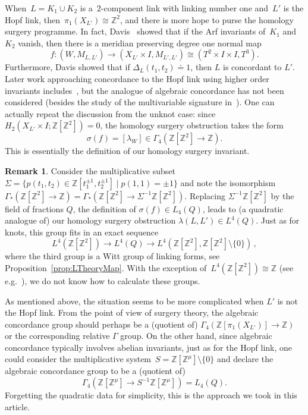 \documentclass[10.9pt,a4paper]{amsart}
\theoremstyle{definition}
\newtheorem{remark}[theorem]{Remark}
\theoremstyle{remark}
\newcommand{\Z}{\mathbb{Z}}
\begin{document}
When~$L=K_1 \cup K_2$ is a~$2$-component link with linking number one and~$L'$ is the Hopf link, then~$\pi_1(X_{L'}) \cong \Z^2$,  and there is more hope to purse the homology surgery programme.
In fact, Davis~\cite{DavisConcordant} showed that if the Arf invariants of~$K_1$ and~$K_2$ vanish, then there is a meridian preserving degree one normal map 
$$f \colon (W,M_{L,L'}) \to (X_{L'} \times I,M_{L',L'}) \cong (T^2\times I \times I,T^3).$$
Furthermore, Davis showed that if $\Delta_L(t_1,t_2) \doteq 1$, then $L$ is concordant to $L'$.
Later work approaching concordance to the Hopf link using higher order invariants includes~\cite{FriedlPowellHopf,ChaSymmetric,KimWhitney}, but the analogue of algebraic concordance has not been considered (besides the study of the multivariable signature in~\cite{ConwayNagelToffoli}).
One can actually repeat the discussion from the unknot case: since~$H_2(X_{L'} \times I;\Z[\Z^2])=0$, the homology surgery obstruction takes the form 
$$ \sigma(f)=[\lambda_W] \in \Gamma_4(\Z[\Z^2] \to \Z).$$ 
This is essentially the definition of our homology surgery invariant.


\begin{remark}
Consider the multiplicative subset~$\Sigma=\{ p(t_1,t_2) \in \Z[t_1^{\pm 1},t_2^{\pm 1}] \mid p(1,1)=\pm 1\}$ and note the isomorphism~$\Gamma_*(\Z[\Z^2] \to \Z) = \Gamma_*(\Z[\Z^2] \to \Sigma^{-1}\Z[\Z^2]).$
Replacing $\Sigma^{-1}\Z[\Z^2]$ by the field of fractions $Q$, the definition of $\sigma(f) \in L_4(Q)$, leads to (a quadratic analogue of) our homology surgery obstruction $\lambda(L,L') \in L^4(Q).$
Just as for knots,  this group fits in an exact sequence
\[
L^4(\Z[\Z^2])\to L^4(Q)\to L^4(\Z[\Z^2],\Z[\Z^2]\setminus\{0\})\,,
\]
where the third group is a Witt group of linking forms, see Proposition~\ref{prop:LTheoryMap}.
With the exception of~$L^4(\Z[\Z^2])\cong\Z$ (see e.g.~\cite{MilgramRanicki}),
we do not know how to calculate these groups.
\end{remark}

As mentioned above,  the situation seems to be more complicated when $L'$ is not the Hopf link.
From the point of view of surgery theory, the algebraic concordance group should perhaps be a (quotient of) $\Gamma_4(\Z[\pi_1(X_{L'})]\to \Z)$ or the corresponding relative $\Gamma$ group.
On the other hand, since algebraic concordance typically involves abelian invariants,  just as for the Hopf link, one could consider the multiplicative system~$S=\Z[\Z^\mu] \setminus \{0\}$ and declare the algebraic concordance group to be a (quotient of)
$$\Gamma_4(\Z[\Z^\mu] \to S^{-1}\Z[\Z^\mu])=L_4(Q).$$
Forgetting the quadratic data for simplicity, this is the approach we took in this article.
\end{document}
